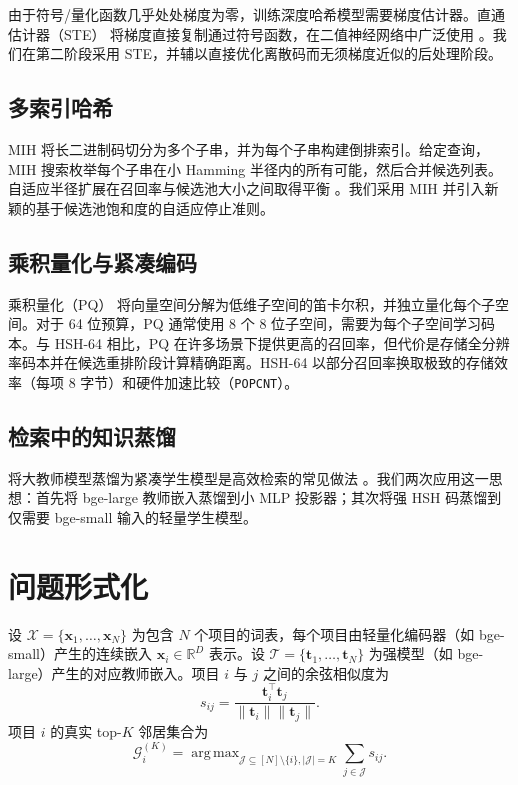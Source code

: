 \documentclass[11pt,a4paper]{article}
\DeclareMathOperator*{\argmax}{arg\,max}
\begin{document}
由于符号/量化函数几乎处处梯度为零，训练深度哈希模型需要梯度估计器。直通估计器（STE）\citep{bengio2013estimating} 将梯度直接复制通过符号函数，在二值神经网络中广泛使用 \citep{courbariaux2016binarized}。我们在第二阶段采用 STE，并辅以直接优化离散码而无须梯度近似的后处理阶段。

\subsection{多索引哈希}

MIH \citep{norouzi2012fast} 将长二进制码切分为多个子串，并为每个子串构建倒排索引。给定查询，MIH 搜索枚举每个子串在小 Hamming 半径内的所有可能，然后合并候选列表。自适应半径扩展在召回率与候选池大小之间取得平衡 \citep{wang2018survey}。我们采用 MIH 并引入新颖的基于候选池饱和度的自适应停止准则。

\subsection{乘积量化与紧凑编码}

乘积量化（PQ）\citep{jegou2011product} 将向量空间分解为低维子空间的笛卡尔积，并独立量化每个子空间。对于 64 位预算，PQ 通常使用 8 个 8 位子空间，需要为每个子空间学习码本。与 HSH-64 相比，PQ 在许多场景下提供更高的召回率，但代价是存储全分辨率码本并在候选重排阶段计算精确距离。HSH-64 以部分召回率换取极致的存储效率（每项 8 字节）和硬件加速比较（\texttt{POPCNT}）。

\subsection{检索中的知识蒸馏}

将大教师模型蒸馏为紧凑学生模型是高效检索的常见做法 \citep{hinton2015distilling,izacard2020distilling}。我们两次应用这一思想：首先将 bge-large 教师嵌入蒸馏到小 MLP 投影器；其次将强 HSH 码蒸馏到仅需要 bge-small 输入的轻量学生模型。

\section{问题形式化}

设 $\mathcal{X} = \{\mathbf{x}_1, \dots, \mathbf{x}_N\}$ 为包含 $N$ 个项目的词表，每个项目由轻量化编码器（如 bge-small）产生的连续嵌入 $\mathbf{x}_i \in \mathbb{R}^D$ 表示。设 $\mathcal{T} = \{\mathbf{t}_1, \dots, \mathbf{t}_N\}$ 为强模型（如 bge-large）产生的对应教师嵌入。项目 $i$ 与 $j$ 之间的余弦相似度为
\begin{equation}
    s_{ij} = \frac{\mathbf{t}_i^\top \mathbf{t}_j}{\| \mathbf{t}_i \| \| \mathbf{t}_j \|}.
\end{equation}
项目 $i$ 的真实 top-$K$ 邻居集合为
\begin{equation}
    \mathcal{G}_i^{(K)} = \argmax_{\mathcal{J} \subseteq [N] \setminus \{i\}, |\mathcal{J}|=K} \sum_{j \in \mathcal{J}} s_{ij}.
\end{equation}
\end{document}
